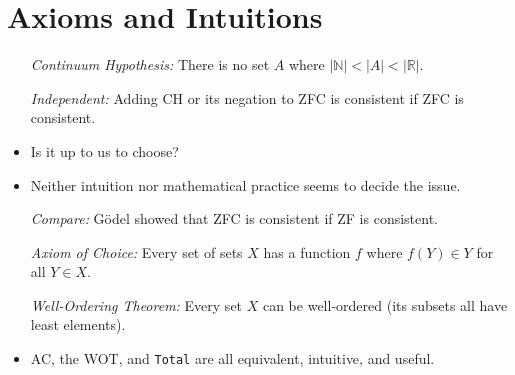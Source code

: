 \documentclass[a4paper, 11pt]{article} %
\newcommand{\set}[1]{\lbrace#1\rbrace} %
\newcommand{\abs}[1]{|#1|} %
\newcommand{\N}{\mathbb{N}}
\newcommand{\R}{\mathbb{R}}
\begin{document}



\section*{Axioms and Intuitions}

\begin{itemize}
  \item[\it Continuum Hypothesis:] There is no set $A$ where $\abs{\N} < \abs{A} < \abs{\R}$.
  \item[\it Independent:] Adding CH or its negation to ZFC is consistent if ZFC is consistent.
  \item Is it up to us to choose?
  \item Neither intuition nor mathematical practice seems to decide the issue.
  \item[\it Compare:] G\"{o}del showed that ZFC is consistent if ZF is consistent.
  \item[\it Axiom of Choice:] Every set of sets $X$ has a function $f$ where $f(Y)\in Y$ for all $Y\in X$. 
  \item[\it Well-Ordering Theorem:] Every set $X$ can be well-ordered (its subsets all have least elements). 
  \item AC, the WOT, and \texttt{Total} are all equivalent, intuitive, and useful.
\end{itemize}
\end{document}
